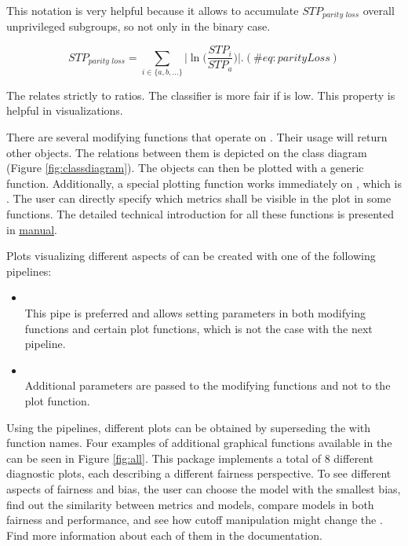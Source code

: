 This notation is very helpful because it allows to accumulate
\(STP_{\textit{parity loss}}\) overall unprivileged subgroups, so not
only in the binary case.

\begin{equation} 
STP_{\textit{parity loss}} = \sum_{i \in \{a, b, ...\}} \Big|\ln \Big(\frac{STP_i}{STP_a} \Big)\Big|.  
\label{eq:parityLoss}
  (\#eq:parityLoss)
\end{equation}

The  relates strictly to ratios. The classifier is
more fair if  is low. This property is helpful in
visualizations.

There are several modifying functions that operate on
. Their usage will return other objects. The
relations between them is depicted on the class diagram (Figure
\ref{fig:classdiagram}). The objects can then be plotted with a generic
 function. Additionally, a special plotting function
works immediately on , which is
. The user can directly specify which metrics
shall be visible in the plot in some functions. The detailed technical
introduction for all these functions is presented in
\href{https://cran.r-project.org/web/packages/fairmodels/fairmodels.pdf}{ manual}.

\clearpage

Plots visualizing different aspects of  can be
created with one of the following pipelines:

\begin{itemize}
\tightlist
\item
  ~\\
  This pipe is preferred and allows setting parameters in both modifying
  functions and certain plot functions, which is not the case with the
  next pipeline.
\item
  ~\\
  Additional parameters are passed to the modifying functions and not to
  the plot function.
\end{itemize}

Using the pipelines, different plots can be obtained by superseding the
 with function names. Four examples of
additional graphical functions available in the  can
be seen in Figure \ref{fig:all}. This package implements a total of 8
different diagnostic plots, each describing a different fairness
perspective. To see different aspects of fairness and bias, the user can
choose the model with the smallest bias, find out the similarity between
metrics and models, compare models in both fairness and performance, and
see how cutoff manipulation might change the . Find
more information about each of them in the documentation.


